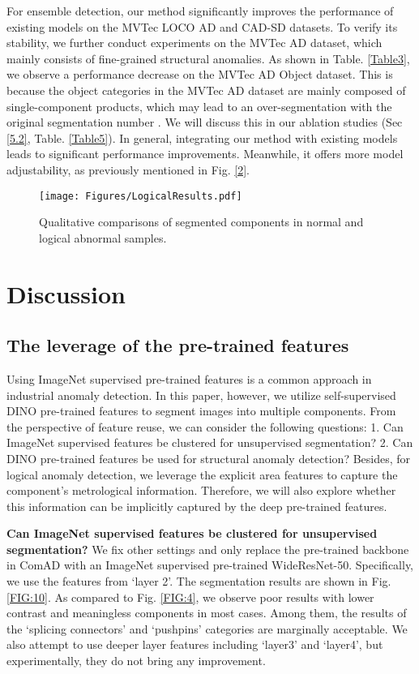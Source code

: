\documentclass[final,5p,times,twocolumn]{elsarticle}
\begin{document}
For ensemble detection, our method significantly improves the performance of existing models on the MVTec LOCO AD and CAD-SD datasets. To verify its stability, we further conduct experiments on the MVTec AD dataset, which mainly consists of fine-grained structural anomalies. As shown in Table. \ref{Table3}, we observe a performance decrease on the MVTec AD Object dataset. This is because the object categories in the MVTec AD dataset are mainly composed of single-component products, which may lead to an over-segmentation with the original segmentation number . We will discuss this in our ablation studies (Sec \ref{5.2}, Table. \ref{Table5}). In general, integrating our method with existing models leads to significant performance improvements. Meanwhile, it offers more model adjustability, as previously mentioned in Fig. \ref{2}.    

\begin{figure}
\centering
		\texttt{[image: Figures/LogicalResults.pdf]}\caption{Qualitative comparisons of segmented components in normal and logical abnormal samples.}
	\label{FIG:9}
\end{figure}

\section{Discussion}
\subsection{The leverage of the pre-trained features}
\label{5.1}
Using ImageNet supervised pre-trained features is a common approach in industrial anomaly detection. In this paper, however, we utilize self-supervised DINO pre-trained features to segment images into multiple components. From the perspective of feature reuse, we can consider the following questions: 1. Can ImageNet supervised features be clustered for unsupervised segmentation? 2. Can DINO pre-trained features be used for structural anomaly detection? Besides, for logical anomaly detection, we leverage the explicit area features to capture the component's metrological information. Therefore, we will also explore whether this information can be implicitly captured by the deep pre-trained features.

\textbf{Can ImageNet supervised features be clustered for unsupervised segmentation?} We fix other settings and only replace the pre-trained backbone in ComAD with an ImageNet supervised pre-trained WideResNet-50. Specifically, we use the features from `layer 2'. The segmentation results are shown in Fig. \ref{FIG:10}. As compared to Fig. \ref{FIG:4}, we observe poor results with lower contrast and meaningless components in most cases. Among them, the results of the `splicing connectors' and `pushpins' categories are marginally acceptable. We also attempt to use deeper layer features including `layer3' and `layer4', but experimentally, they do not bring any improvement.
\end{document}
